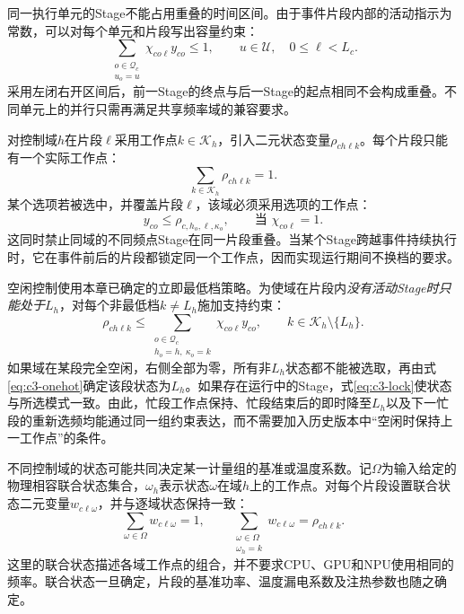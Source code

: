 同一执行单元的Stage不能占用重叠的时间区间。由于事件片段内部的活动指示为常数，可以对每个单元和片段写出容量约束：
\begin{equation}
 \sum_{\substack{o\in\mathcal Q_c\\u_o=u}}
       \chi_{co\ell}y_{co}\le1,
 \qquad u\in\mathcal U,\quad 0\le\ell<L_c.
 \label{eq:c3-occupancy}
\end{equation}
采用左闭右开区间后，前一Stage的终点与后一Stage的起点相同不会构成重叠。不同单元上的并行只需再满足共享频率域的兼容要求。

对控制域$h$在片段$\ell$采用工作点$k\in\mathcal K_h$，引入二元状态变量$\rho_{ch\ell k}$。每个片段只能有一个实际工作点：
\begin{equation}
 \sum_{k\in\mathcal K_h}\rho_{ch\ell k}=1.
 \label{eq:c3-onehot}
\end{equation}
某个选项若被选中，并覆盖片段$\ell$，该域必须采用选项的工作点：
\begin{equation}
 y_{co}\le \rho_{c,h_o,\ell,\kappa_o},
 \qquad\text{当 }\chi_{co\ell}=1.
 \label{eq:c3-lock}
\end{equation}
这同时禁止同域的不同频点Stage在同一片段重叠。当某个Stage跨越事件持续执行时，它在事件前后的片段都锁定同一个工作点，因而实现运行期间不换档的要求。

空闲控制使用本章已确定的立即最低档策略。为使域在片段内\emph{没有活动Stage时只能处于$L_h$}，对每个非最低档$k\ne L_h$施加支持约束：
\begin{equation}
 \rho_{ch\ell k}\le
 \sum_{\substack{o\in\mathcal Q_c\\h_o=h,\ \kappa_o=k}}
      \chi_{co\ell}y_{co},
 \qquad k\in\mathcal K_h\setminus\{L_h\}.
 \label{eq:c3-auto-low}
\end{equation}
如果域在某段完全空闲，右侧全部为零，所有非$L_h$状态都不能被选取，再由式\eqref{eq:c3-onehot}确定该段状态为$L_h$。如果存在运行中的Stage，式\eqref{eq:c3-lock}使状态与所选模式一致。由此，忙段工作点保持、忙段结束后的即时降至$L_h$以及下一忙段的重新选频均能通过同一组约束表达，而不需要加入历史版本中“空闲时保持上一工作点”的条件。

不同控制域的状态可能共同决定某一计量组的基准或温度系数。记$\Omega$为输入给定的物理相容联合状态集合，$\omega_h$表示状态$\omega$在域$h$上的工作点。对每个片段设置联合状态二元变量$w_{c\ell\omega}$，并与逐域状态保持一致：
\begin{equation}
 \sum_{\omega\in\Omega}w_{c\ell\omega}=1,\qquad
 \sum_{\substack{\omega\in\Omega\\\omega_h=k}}
 w_{c\ell\omega}=\rho_{ch\ell k}.
 \label{eq:c3-combined}
\end{equation}
这里的联合状态描述各域工作点的组合，并不要求CPU、GPU和NPU使用相同的频率。联合状态一旦确定，片段的基准功率、温度漏电系数及注热参数也随之确定。

